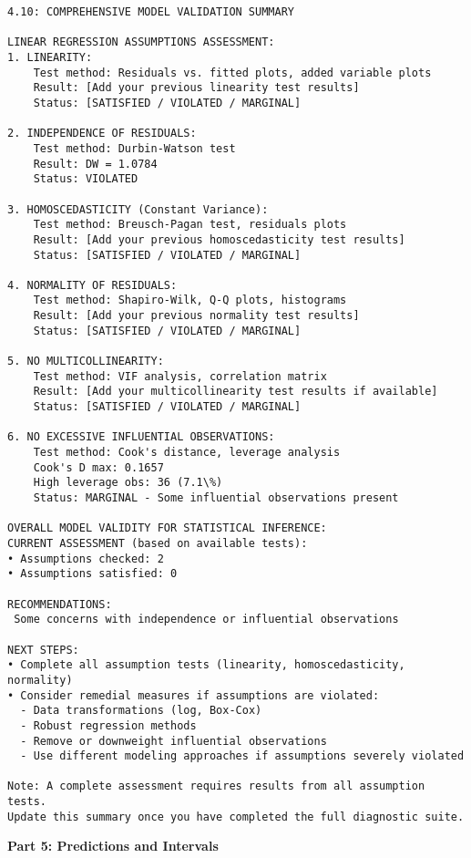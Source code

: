 \documentclass[8pt, twocolumn]{extarticle}
\begin{document}
    \begin{Verbatim}[commandchars=\\\{\}]
4.10: COMPREHENSIVE MODEL VALIDATION SUMMARY

LINEAR REGRESSION ASSUMPTIONS ASSESSMENT:
1. LINEARITY:
    Test method: Residuals vs. fitted plots, added variable plots
    Result: [Add your previous linearity test results]
    Status: [SATISFIED / VIOLATED / MARGINAL]

2. INDEPENDENCE OF RESIDUALS:
    Test method: Durbin-Watson test
    Result: DW = 1.0784
    Status: VIOLATED

3. HOMOSCEDASTICITY (Constant Variance):
    Test method: Breusch-Pagan test, residuals plots
    Result: [Add your previous homoscedasticity test results]
    Status: [SATISFIED / VIOLATED / MARGINAL]

4. NORMALITY OF RESIDUALS:
    Test method: Shapiro-Wilk, Q-Q plots, histograms
    Result: [Add your previous normality test results]
    Status: [SATISFIED / VIOLATED / MARGINAL]

5. NO MULTICOLLINEARITY:
    Test method: VIF analysis, correlation matrix
    Result: [Add your multicollinearity test results if available]
    Status: [SATISFIED / VIOLATED / MARGINAL]

6. NO EXCESSIVE INFLUENTIAL OBSERVATIONS:
    Test method: Cook's distance, leverage analysis
    Cook's D max: 0.1657
    High leverage obs: 36 (7.1\%)
    Status: MARGINAL - Some influential observations present

OVERALL MODEL VALIDITY FOR STATISTICAL INFERENCE:
CURRENT ASSESSMENT (based on available tests):
• Assumptions checked: 2
• Assumptions satisfied: 0

RECOMMENDATIONS:
 Some concerns with independence or influential observations

NEXT STEPS:
• Complete all assumption tests (linearity, homoscedasticity, normality)
• Consider remedial measures if assumptions are violated:
  - Data transformations (log, Box-Cox)
  - Robust regression methods
  - Remove or downweight influential observations
  - Use different modeling approaches if assumptions severely violated

Note: A complete assessment requires results from all assumption tests.
Update this summary once you have completed the full diagnostic suite.
    \end{Verbatim}

    \centering
    \textbf{Part 5: Predictions and Intervals}
\end{document}
